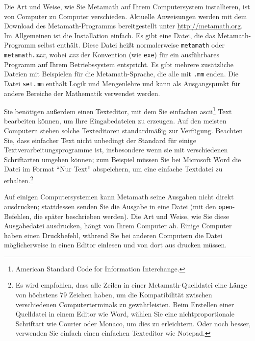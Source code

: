 Die Art und Weise, wie Sie Metamath auf Ihrem Computersystem installieren, ist von Computer zu Computer verschieden.  Aktuelle Anweisungen werden mit dem Download des Metamath-Programms bereitgestellt unter \url{http://metamath.org}.  Im Allgemeinen ist die Installation einfach.
Es gibt eine Datei, die das Metamath-Programm selbst enthält.
Diese Datei heißt normalerweise \texttt{metamath} oder \texttt{metamath.}{\em xxx}, wobei {\em xxx} der Konvention (wie \texttt{exe}) für ein ausführbares Programm auf Ihrem Betriebssystem entspricht.  Es gibt mehrere zusätzliche Dateien mit Beispielen für die Metamath-Sprache, die alle mit \texttt{.mm} enden.  Die Datei \texttt{set.mm} enthält Logik und Mengenlehre und kann als Ausgangspunkt für andere Bereiche der Mathematik verwendet werden.

Sie benötigen außerdem einen Texteditor, mit dem Sie einfachen {\sc ascii}\footnote{American Standard Code for Information Interchange.} Text bearbeiten können, um Ihre Eingabedateien zu erzeugen.  Auf den meisten Computern stehen solche Texteditoren standardmäßig zur Verfügung.  Beachten Sie, dass einfacher Text nicht unbedingt der Standard für einige Textverarbeitungsprogramme ist, insbesondere wenn sie mit verschiedenen Schriftarten umgehen können; zum Beispiel müssen Sie bei Microsoft Word die Datei im Format "`Nur Text"' abspeichern, um eine einfache Textdatei zu erhalten.\footnote{Es wird empfohlen, dass alle Zeilen in einer Metamath-Quelldatei eine Länge von höchstens 79 Zeichen haben, um die Kompatibilität zwischen verschiedenen Computerterminals zu gewährleisten.  Beim Erstellen einer Quelldatei in einem Editor wie Word, wählen Sie eine nichtproportionale Schriftart wie Courier oder Monaco, um dies zu erleichtern.  Oder noch besser, verwenden Sie einfach einen einfachen Texteditor wie Notepad.}

Auf einigen Computersystemen kann Metamath seine Ausgaben nicht direkt ausdrucken; stattdessen senden Sie die Ausgabe in eine Datei (mit den \texttt{open}-Befehlen, die später beschrieben werden).  Die Art und Weise, wie Sie diese Ausgabedatei ausdrucken, hängt von Ihrem Computer ab. Einige Computer haben einen Druckbefehl, während Sie bei anderen Computern die Datei möglicherweise in einen Editor einlesen und von dort aus drucken müssen.

